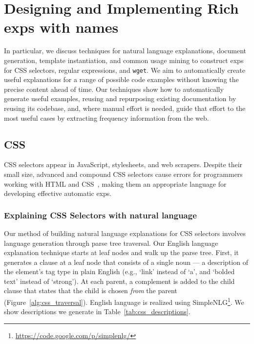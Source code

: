 \section{Designing and Implementing Rich \Glspl{exp} with \Glspl{name}}

In particular, we discuss techniques for natural language explanations, document generation, template instantiation, and common usage mining to construct \glspl{exp} for CSS selectors, regular expressions, and \texttt{wget}.
We aim to automatically create useful explanations for a range of possible code examples without knowing the precise content ahead of time. 
 Our techniques show how to automatically generate useful examples, reusing and repurposing existing documentation by reusing its codebase, and, where manual effort is needed, guide that effort to the most useful cases by extracting frequency information from the web. \fi

\subsection{CSS}

CSS selectors appear in JavaScript, stylesheets, and web scrapers.
Despite their small size, advanced and compound CSS selectors cause errors for programmers working with HTML and CSS~\cite{park_towards_2013}, making them an appropriate language for developing effective automatic \glspl{exp}.

\subsubsection{Explaining CSS Selectors with natural language}

Our method of building natural language explanations for CSS selectors involves language generation through parse tree traversal.
Our English language explanation technique starts at leaf nodes and walk up the parse tree.
First, it generates a clause at a leaf node that consists of a single noun --- a description of the element's tag type in plain English (e.g., `link' instead of `a', and `bolded text' instead of `strong').
At each parent, a complement is added to the child clause that states that the child is chosen \emph{from} the parent (Figure~\ref{alg:css_traversal}).
English language is realized using SimpleNLG\footnote{\url{https://code.google.com/p/simplenlg/}}.
We show descriptions we generate in Table~\ref{tab:css_descriptions}.

